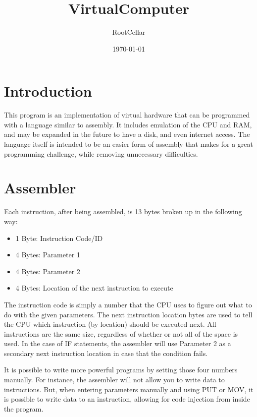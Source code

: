 \documentclass[12pt]{article}
\title{VirtualComputer}
\author{RootCellar}
\date{\today}
\begin{document}
\maketitle

\section{Introduction}

This program is an implementation of virtual hardware that can be programmed with a language similar to assembly.
It includes emulation of the CPU and RAM, and may be expanded in the future to have a disk, and even internet access.
The language itself is intended to be an easier form of assembly that makes for a great programming challenge, while
removing unnecessary difficulties.

\section{Assembler}

\vspace{12pt}

Each instruction, after being assembled, is 13 bytes broken up in the following way:
\begin{itemize}

\item
1 Byte: Instruction Code/ID

\item
4 Bytes: Parameter 1

\item
4 Bytes: Parameter 2

\item
4 Bytes: Location of the next instruction to execute

\end{itemize}

\vspace{12pt}

The instruction code is simply a number that the CPU uses to figure out what to do with the given parameters.
The next instruction location bytes are used to tell the CPU which instruction (by location) should be executed next.
All instructions are the same size, regardless of whether or not all of the space is used.
In the case of IF statements, the assembler will use Parameter 2 as a secondary next instruction location
in case that the condition fails.

It is possible to write more powerful programs by setting those four numbers manually. For instance,
the assembler will not allow you to write data to instructions. But, when entering parameters manually and using PUT or MOV, it is possible
to write data to an instruction, allowing for code injection from inside the program.
\end{document}
